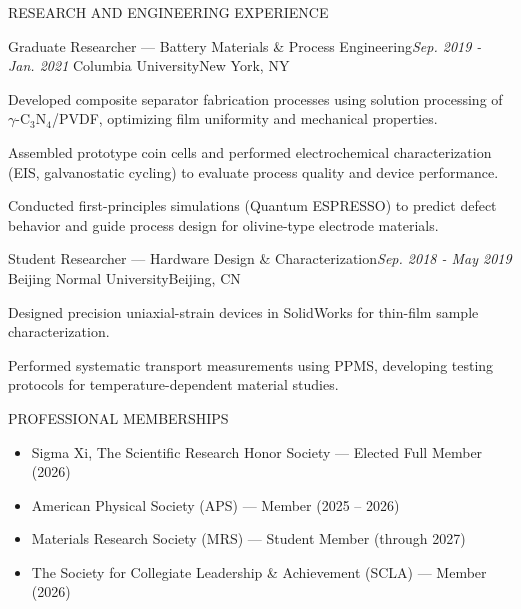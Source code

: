 \documentclass{resume}
\begin{document}
\begin{rSection}{RESEARCH AND ENGINEERING EXPERIENCE}
\begin{rSubsection}
    {Graduate Researcher --- Battery Materials \& Process Engineering}{\em Sep. 2019 - Jan. 2021}
    {Columbia University}{New York, NY}
\item Developed composite separator fabrication processes using solution processing of $\gamma$-C$_3$N$_4$/PVDF, optimizing film uniformity and mechanical properties.
\item Assembled prototype coin cells and performed electrochemical characterization (EIS, galvanostatic cycling) to evaluate process quality and device performance.
\item Conducted first-principles simulations (Quantum ESPRESSO) to predict defect behavior and guide process design for olivine-type electrode materials.
\end{rSubsection}

\begin{rSubsection}
    {Student Researcher --- Hardware Design \& Characterization}{\em Sep. 2018 - May 2019}
    {Beijing Normal University}{Beijing, CN}
\item Designed precision uniaxial-strain devices in SolidWorks for thin-film sample characterization.
\item Performed systematic transport measurements using PPMS, developing testing protocols for temperature-dependent material studies.
\end{rSubsection}

\end{rSection}


\begin{rSection}{PROFESSIONAL MEMBERSHIPS}
\begin{itemize}
\itemsep 0.05em
\item Sigma Xi, The Scientific Research Honor Society --- Elected Full Member (2026)
\item American Physical Society (APS) --- Member (2025 -- 2026)
\item Materials Research Society (MRS) --- Student Member (through 2027)
\item The Society for Collegiate Leadership \& Achievement (SCLA) --- Member (2026)
\end{itemize}
\end{rSection}
\end{document}
